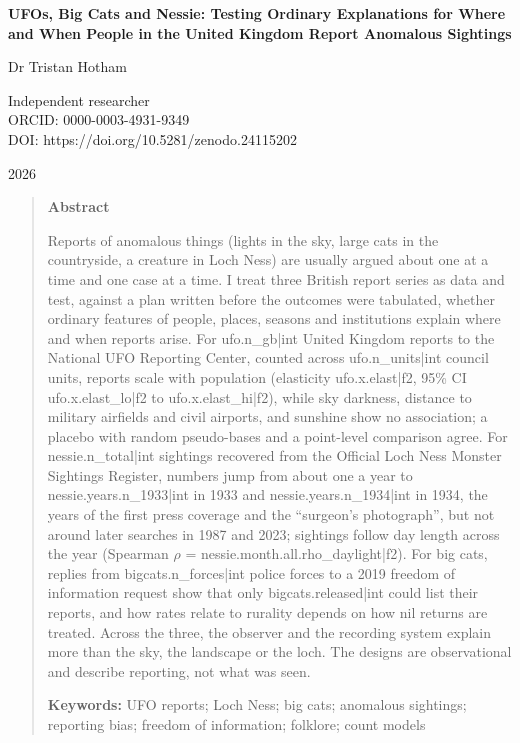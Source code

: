 \documentclass[11pt,a4paper]{article}
\begin{document}
\begin{center}
{\Large\bfseries UFOs, Big Cats and Nessie: Testing Ordinary Explanations for Where and When People in the United Kingdom Report Anomalous Sightings\par}
\vspace{1.2em}
{\large Dr Tristan Hotham\par}
\vspace{0.3em}
{\small Independent researcher\\
ORCID: 0000-0003-4931-9349\\
DOI: https://doi.org/10.5281/zenodo.24115202\par}
\vspace{0.8em}
2026
\end{center}

\begin{quote}
\small
\begin{center}\textbf{Abstract}\end{center}
Reports of anomalous things (lights in the sky, large cats in the countryside, a creature in Loch Ness) are usually argued about one at a time and one case at a time. I treat three British report series as data and test, against a plan written before the outcomes were tabulated, whether ordinary features of people, places, seasons and institutions explain where and when reports arise. For {{ufo.n_gb|int}} United Kingdom reports to the National UFO Reporting Center, counted across {{ufo.n_units|int}} council units, reports scale with population (elasticity {{ufo.x.elast|f2}}, 95\% CI {{ufo.x.elast_lo|f2}} to {{ufo.x.elast_hi|f2}}), while sky darkness, distance to military airfields and civil airports, and sunshine show no association; a placebo with random pseudo-bases and a point-level comparison agree. For {{nessie.n_total|int}} sightings recovered from the Official Loch Ness Monster Sightings Register, numbers jump from about one a year to {{nessie.years.n_1933|int}} in 1933 and {{nessie.years.n_1934|int}} in 1934, the years of the first press coverage and the ``surgeon's photograph'', but not around later searches in 1987 and 2023; sightings follow day length across the year (Spearman $\rho$ = {{nessie.month.all.rho_daylight|f2}}). For big cats, replies from {{bigcats.n_forces|int}} police forces to a 2019 freedom of information request show that only {{bigcats.released|int}} could list their reports, and how rates relate to rurality depends on how nil returns are treated. Across the three, the observer and the recording system explain more than the sky, the landscape or the loch. The designs are observational and describe reporting, not what was seen.

\textbf{Keywords:} UFO reports; Loch Ness; big cats; anomalous sightings; reporting bias; freedom of information; folklore; count models
\end{quote}
\end{document}
